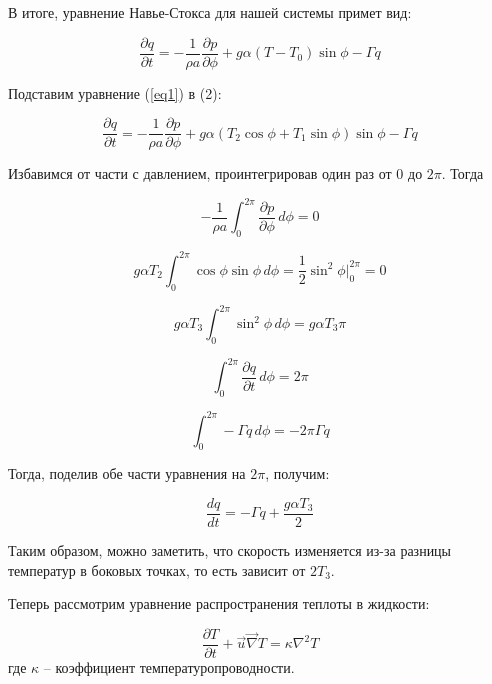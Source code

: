 \documentclass[12pt]{article}
\begin{document}
В итоге, уравнение Навье-Стокса для нашей системы примет вид:

\begin{equation}\label{eq2}
\frac{\partial q}{\partial t} = -\frac{1}{\rho a}\frac{\partial p}{\partial \phi} + g \alpha (T-T_0) \sin\phi -\Gamma q
\end{equation}

Подставим уравнение (\ref{eq1}) в (2):

\begin{equation*}
\frac{\partial q}{\partial t} = -\frac{1}{\rho a}\frac{\partial p}{\partial \phi} + g \alpha (T_2\cos\phi + T_1\sin\phi) \sin\phi -\Gamma q
\end{equation*}

Избавимся от части с давлением, проинтегрировав один раз от 0 до $2\pi$. Тогда 

\begin{equation*}
-\frac{1}{\rho a} \int_{0}^{2\pi} \frac{\partial p}{\partial \phi}\, d\phi = 0
\end{equation*}

\begin{equation*}
g \alpha T_2 \int_{0}^{2\pi} \cos\phi \sin\phi\, d\phi = \frac{1}{2} \sin^2 \phi \Big|_0^{2\pi} = 0
\end{equation*}

\begin{equation*}
g \alpha T_3 \int_{0}^{2\pi} \sin^2 \phi\, d\phi = g \alpha T_3 \pi
\end{equation*}

\begin{equation*}
\int_{0}^{2\pi} \frac{\partial q}{\partial t}\, d\phi = 2\pi
\end{equation*}

\begin{equation*}
\int_{0}^{2\pi} -\Gamma q\, d\phi = -2\pi\Gamma q
\end{equation*}

Тогда, поделив обе части уравнения на $2\pi$, получим:

\begin{equation}\label{eq23}
\frac{dq}{dt} = -\Gamma q + \frac{g \alpha T_3}{2}
\end{equation}

Таким образом, можно заметить, что скорость изменяется из-за разницы температур в боковых точках, то есть зависит от $2T_3$.

Теперь рассмотрим уравнение распространения теплоты в жидкости:

\begin{equation*}
\frac{\partial T}{\partial t} + \overrightarrow{u} \overrightarrow{\nabla} T = \kappa \nabla^2 T 
\end{equation*}
где $\kappa$ -- коэффициент температуропроводности.
\end{document}
